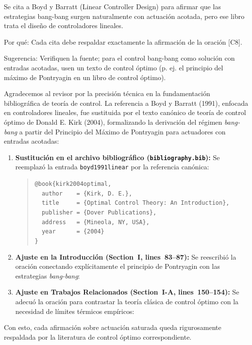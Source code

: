 \documentclass{LabDSTresponse}
\begin{document}
{Se cita a Boyd y Barratt (Linear Controller Design) para afirmar que las estrategias bang-bang surgen naturalmente con actuación acotada, pero ese libro trata el diseño de controladores lineales.

Por qué: Cada cita debe respaldar exactamente la afirmación de la oración [C8].

Sugerencia: Verifiquen la fuente; para el control bang-bang como solución con entradas acotadas, usen un texto de control óptimo (p. ej. el principio del máximo de Pontryagin en un libro de control óptimo).}
{Agradecemos al revisor por la precisión técnica en la fundamentación bibliográfica de teoría de control. La referencia a Boyd y Barratt (1991), enfocada en controladores lineales, fue sustituida por el texto canónico de teoría de control óptimo de Donald E. Kirk (2004), formalizando la derivación del régimen \textit{bang-bang} a partir del Principio del Máximo de Pontryagin para actuadores con entradas acotadas:
\begin{enumerate}
    \item \textbf{Sustitución en el archivo bibliográfico (\texttt{bibliography.bib}):}
    Se reemplazó la entrada \texttt{boyd1991linear} por la referencia canónica:
    \begin{quote}\footnotesize
    \texttt{@book\{kirk2004optimal,}\\
    \texttt{~~author~~~~= \{Kirk, D. E.\},}\\
    \texttt{~~title~~~~~= \{Optimal Control Theory: An Introduction\},}\\
    \texttt{~~publisher~= \{Dover Publications\},}\\
    \texttt{~~address~~~= \{Mineola, NY, USA\},}\\
    \texttt{~~year~~~~~~= \{2004\}}\\
    \texttt{\}}
    \end{quote}
    \item \textbf{Ajuste en la Introducción (Section~I, lines~83--87):}
    Se reescribió la oración conectando explícitamente el principio de Pontryagin con las estrategias \textit{bang-bang}:
    \item \textbf{Ajuste en Trabajos Relacionados (Section~I-A, lines~150--154):}
    Se adecuó la oración para contrastar la teoría clásica de control óptimo con la necesidad de límites térmicos empíricos:
\end{enumerate}
Con esto, cada afirmación sobre actuación saturada queda rigurosamente respaldada por la literatura de control óptimo correspondiente.}
\end{document}
